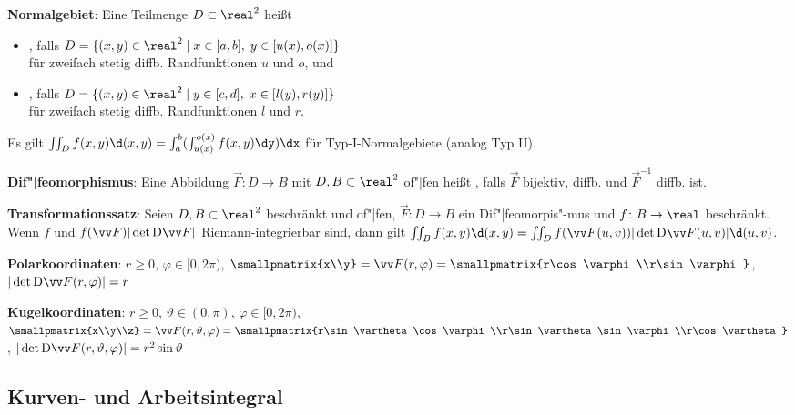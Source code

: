 \linie

\textbf{Normalgebiet}:
Eine Teilmenge $D \subset \real^2$ heißt
\begin{itemize}
    \item
    ,
    falls $D = \{(x, y) \in \real^2 \;|\; x \in [a, b],\; y \in [u(x), o(x)]\}$\\
    für zweifach stetig diffb. Randfunktionen $u$ und $o$, und

    \item
    ,
    falls $D = \{(x, y) \in \real^2 \;|\; y \in [c, d],\; x \in [l(y), r(y)]\}$\\
    für zweifach stetig diffb. Randfunktionen $l$ und $r$.
\end{itemize}
Es gilt $\iint_D f(x, y) \d(x,y) = \int_a^b (\int_{u(x)}^{o(x)} f(x, y) \dy) \dx$
für Typ-I-Normalgebiete (analog Typ II).

\linie

\textbf{Dif"|feomorphismus}:
Eine Abbildung $\vec{F}\colon D \to B$ mit $D, B \subset \real^2$ of"|fen
heißt , falls
$\vec{F}$ bijektiv, diffb. und $\vec{F}^{-1}$ diffb. ist.

\textbf{Transformationssatz}:
Seien $D, B \subset \real^2$ beschränkt und of"|fen,
$\vec{F}\colon D \to B$ ein Dif"|feomorpis"-mus und $f\colon B \to \real$ beschränkt.
Wenn $f$ und $f(\vec{F}) |\det \D\vec{F}|$ Riemann-integrierbar sind,
dann gilt $\iint_B f(x, y) \d(x, y) = \iint_D f(\vec{F}(u, v)) |\det \D\vec{F}(u, v)| \d(u,v)$.

\textbf{Polarkoordinaten}:
$r \ge 0$, $\varphi \in [0, 2\pi)$,
$\smallpmatrix{x\\y} = \vec{F}(r, \varphi) = \smallpmatrix{r\cos\varphi\\r\sin\varphi}$,
$|\det \D\vec{F}(r, \varphi)| = r$

\textbf{Kugelkoordinaten}:
$r \ge 0$, $\vartheta \in (0, \pi)$, $\varphi \in [0, 2\pi)$,\\
$\smallpmatrix{x\\y\\z} = \vec{F}(r, \vartheta, \varphi) =
\smallpmatrix{r\sin\vartheta\cos\varphi\\r\sin\vartheta\sin\varphi\\r\cos\vartheta}$,
$|\det \D\vec{F}(r, \vartheta, \varphi)| = r^2 \sin\vartheta$

\pagebreak

\subsection{%
    Kurven- und Arbeitsintegral%
}

